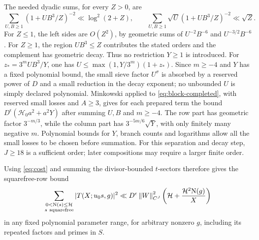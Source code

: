\documentclass[11pt]{article}
\numberwithin{equation}{section}
\theoremstyle{definition}
\theoremstyle{remark}
\newcommand{\N}{\mathrm N}
\newcommand{\norm}[1]{\left\|#1\right\|}
\begin{document}
The needed dyadic sums, for every \(Z>0\), are
\[
 \sum_{U,B\ge1}(1+UB^3/Z)^{-2}\ll\log^2(2+Z),\qquad
 \sum_{U,B\ge1}\sqrt U(1+UB^3/Z)^{-2}\ll\sqrt Z .
\]
For \(Z\le1\), the left sides are \(O(Z^2)\), by geometric sums
of \(U^{-2}B^{-6}\) and \(U^{-3/2}B^{-6}\). For \(Z\ge1\),
the region \(UB^3\le Z\) contributes the stated orders and the
complement has geometric decay. Thus no restriction \(Y\ge1\)
is introduced. For \(z_*=3^mUB^3/Y\), one has
\(U\le\max(1,Y/3^m)(1+z_*)\). Since \(m\ge-4\) and \(Y\)
has a fixed polynomial bound, the small sieve factor \(U^\sigma\)
is absorbed by a reserved power of \(D\) and a small reduction in
the decay exponent; no unbounded \(U\) is simply declared polynomial.
Minkowski applied to \eqref{eq:block-completed},
with reserved small losses and \(A\ge3\), gives for each prepared
term the bound \(D^\epsilon(\mathcal H_0a^2+a^2Y)\)
after summing \(U,B\) and \(m\ge-4\).
The row part has geometric factor \(3^{-m/3}\), while the column
part has \(3^{-5m/6}\sqrt Y\), with only finitely many negative \(m\).
Polynomial bounds for \(Y\), branch counts and logarithms allow
all the small losses to be chosen before summation.
For this separation and decay step, \(J\ge18\) is a sufficient
order; later compositions may require a larger finite order.

Using \eqref{eq:cost} and summing the divisor-bounded \(t\)-sectors
therefore gives the squarefree-row bound
\begin{equation}\label{eq:sf-completed}
 \sum_{\substack{0<\N(s)\le\mathcal H\\s\ {\rm squarefree}}}
 |T(X;u_0s,g)|^2
 \ll D^\epsilon\norm{W}_{C^J}^2
             \left(\mathcal H+\frac{\mathcal H^2\N(g)}X\right)
\end{equation}
in any fixed polynomial parameter range, for arbitrary nonzero
\(g\), including its repeated factors and primes in \(S\).
\end{document}
